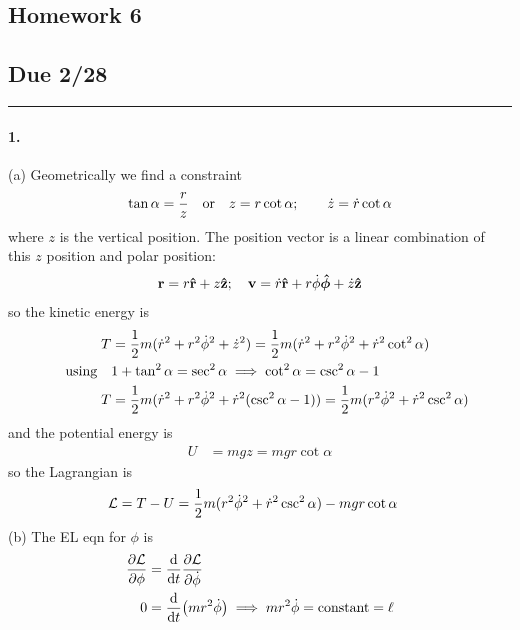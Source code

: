 \documentclass[../hw.tex]{subfiles}
\begin{document}
\setcounter{section}{6}
\begin{center}
  \section*{Homework 6} \label{sec:homework6}
  \subsection*{Due 2/28}
\end{center}
\hrule \vspace{10px}

\paragraph*{1.} (a) Geometrically we find a constraint
\begin{align*}
    \tan \alpha = \frac{r}{z} \qor z = r \cot \alpha; \qquad \dot z  = \dot r \cot \alpha
\end{align*}
where $z$ is the vertical position. The position vector is a linear
combination of this $z$ position and polar position:
\begin{align*}
    \vb r = r \vu r + z \vu z; \quad \vb v = \dot r \vu r + r\dot \phi \vu*\phi + \dot z \vu z
\end{align*}
so the kinetic energy is
\begin{align*}
    T &= \frac{1}{2} m (\dot r^2 + r^2 \dot \phi^2 + \dot z^2)
        = \frac{1}{2} m (\dot r^2 + r^2 \dot \phi^2 + \dot r^2 \cot^2 \alpha) \\
    \qusing &1 + \tan^2 \alpha = \sec^2 \alpha \implies \cot^2 \alpha = \csc^2 \alpha - 1 \\
    T &= \frac{1}{2} m (\dot r^2 + r^2 \dot \phi^2 + \dot r^2 (\csc^2 \alpha - 1))
        = \frac{1}{2} m (r^2 \dot \phi^2 + \dot r^2 \csc^2 \alpha) \\
\end{align*}
and the potential energy is
\begin{align*}
    U &= mgz = mgr \cot \alpha
\end{align*}
so the Lagrangian is
\begin{align*}
    \mathcal{L} &= T - U = \frac{1}{2} m (r^2 \dot \phi^2 + \dot r^2 \csc^2 \alpha) - mgr \cot \alpha
\end{align*}
(b) The EL eqn for $\phi$ is
\begin{align*}
    \pdv{\mathcal{L}}{\phi} &= \dv{t} \pdv{\mathcal{L}}{\dot \phi} \\
    0 &= \dv{t}(mr^2 \dot \phi) \implies mr^2 \dot \phi = \text{constant} = \ell
\end{align*}
\end{document}
